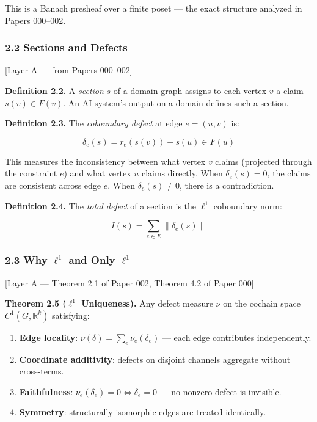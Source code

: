 \documentclass[
]{article}
\providecommand{\tightlist}{%
  \setlength{\itemsep}{0pt}\setlength{\parskip}{0pt}}
\begin{document}
This is a Banach presheaf over a finite poset --- the exact structure
analyzed in Papers 000--002.

\subsubsection{2.2 Sections and Defects}\label{sections-and-defects}

{[}Layer A --- from Papers 000--002{]}

\textbf{Definition 2.2.} A \emph{section} \(s\) of a domain graph
assigns to each vertex \(v\) a claim \(s(v) \in F(v)\). An AI system's
output on a domain defines such a section.

\textbf{Definition 2.3.} The \emph{coboundary defect} at edge
\(e = (u, v)\) is:

\[\delta_e(s) = r_e(s(v)) - s(u) \in F(u)\]

This measures the inconsistency between what vertex \(v\) claims
(projected through the constraint \(e\)) and what vertex \(u\) claims
directly. When \(\delta_e(s) = 0\), the claims are consistent across
edge \(e\). When \(\delta_e(s) \neq 0\), there is a contradiction.

\textbf{Definition 2.4.} The \emph{total defect} of a section is the
\(\ell^1\) coboundary norm:

\[I(s) = \sum_{e \in E} \|\delta_e(s)\|\]

\subsubsection{\texorpdfstring{2.3 Why \(\ell^1\) and Only
\(\ell^1\)}{2.3 Why \textbackslash ell\^{}1 and Only \textbackslash ell\^{}1}}\label{why-ell1-and-only-ell1}

{[}Layer A --- Theorem 2.1 of Paper 002, Theorem 4.2 of Paper 000{]}

\textbf{Theorem 2.5 (\(\ell^1\) Uniqueness).} Any defect measure \(\nu\)
on the cochain space \(C^1(G, \mathbb{R}^k)\) satisfying:

\begin{enumerate}
\def\labelenumi{\arabic{enumi}.}
\tightlist
\item
  \textbf{Edge locality}: \(\nu(\delta) = \sum_e \nu_e(\delta_e)\) ---
  each edge contributes independently.
\item
  \textbf{Coordinate additivity}: defects on disjoint channels aggregate
  without cross-terms.
\item
  \textbf{Faithfulness}: \(\nu_e(\delta_e) = 0 \iff \delta_e = 0\) ---
  no nonzero defect is invisible.
\item
  \textbf{Symmetry}: structurally isomorphic edges are treated
  identically.
\end{enumerate}
\end{document}
